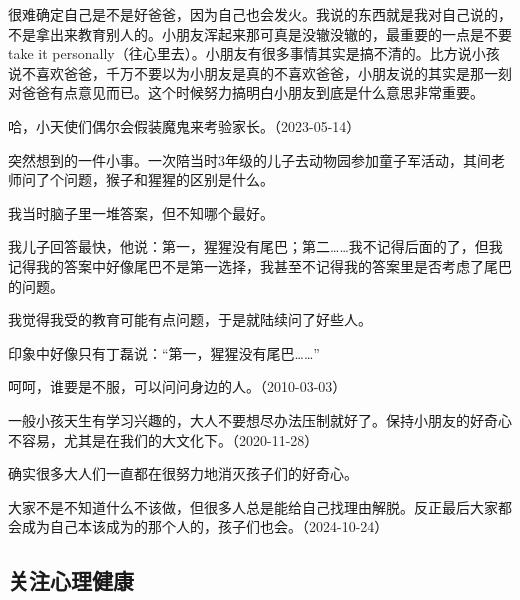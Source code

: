 
很难确定自己是不是好爸爸，因为自己也会发火。我说的东西就是我对自己说的，不是拿出来教育别人的。小朋友浑起来那可真是没辙没辙的，最重要的一点是不要take it personally（往心里去）。小朋友有很多事情其实是搞不清的。比方说小孩说不喜欢爸爸，千万不要以为小朋友是真的不喜欢爸爸，小朋友说的其实是那一刻对爸爸有点意见而已。这个时候努力搞明白小朋友到底是什么意思非常重要。


哈，小天使们偶尔会假装魔鬼来考验家长。（2023-05-14）

突然想到的一件小事。一次陪当时3年级的儿子去动物园参加童子军活动，其间老师问了个问题，猴子和猩猩的区别是什么。

我当时脑子里一堆答案，但不知哪个最好。

我儿子回答最快，他说：第一，猩猩没有尾巴；第二……我不记得后面的了，但我记得我的答案中好像尾巴不是第一选择，我甚至不记得我的答案里是否考虑了尾巴的问题。

我觉得我受的教育可能有点问题，于是就陆续问了好些人。

印象中好像只有丁磊说：“第一，猩猩没有尾巴……”

呵呵，谁要是不服，可以问问身边的人。（2010-03-03）


一般小孩天生有学习兴趣的，大人不要想尽办法压制就好了。保持小朋友的好奇心不容易，尤其是在我们的大文化下。（2020-11-28）


确实很多大人们一直都在很努力地消灭孩子们的好奇心。


大家不是不知道什么不该做，但很多人总是能给自己找理由解脱。反正最后大家都会成为自己本该成为的那个人的，孩子们也会。（2024-10-24）

\subsection{关注心理健康}


